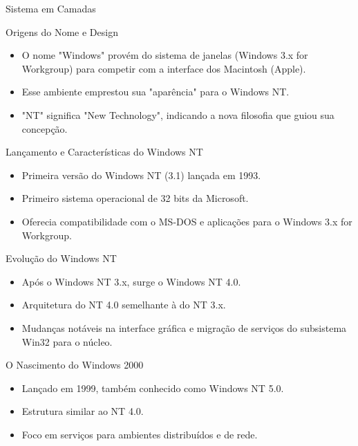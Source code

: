 \documentclass{beamer}
\begin{document}
\begin{frame}{Sistema em Camadas}
\begin{frame}{Origens do Nome e Design}
    \begin{itemize}
        \item O nome "Windows" provém do sistema de janelas (Windows 3.x for Workgroup) para competir com a interface dos Macintosh (Apple).
        \item Esse ambiente emprestou sua "aparência" para o Windows NT.
        \item "NT" significa "New Technology", indicando a nova filosofia que guiou sua concepção.
    \end{itemize}
\end{frame}

\begin{frame}{Lançamento e Características do Windows NT}
    \begin{itemize}
        \item Primeira versão do Windows NT (3.1) lançada em 1993.
        \item Primeiro sistema operacional de 32 bits da Microsoft.
        \item Oferecia compatibilidade com o MS-DOS e aplicações para o Windows 3.x for Workgroup.
    \end{itemize}
\end{frame}
\begin{frame}{Evolução do Windows NT}
    \begin{itemize}
        \item Após o Windows NT 3.x, surge o Windows NT 4.0.
        \item Arquitetura do NT 4.0 semelhante à do NT 3.x.
        \item Mudanças notáveis na interface gráfica e migração de serviços do subsistema Win32 para o núcleo.
    \end{itemize}
\end{frame}

\begin{frame}{O Nascimento do Windows 2000}
    \begin{itemize}
        \item Lançado em 1999, também conhecido como Windows NT 5.0.
        \item Estrutura similar ao NT 4.0.
        \item Foco em serviços para ambientes distribuídos e de rede.
    \end{itemize}
\end{frame}


\end{frame}
\end{document}
